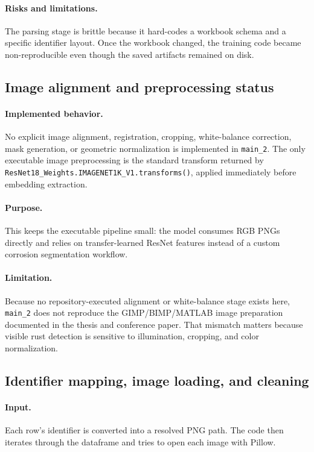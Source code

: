 \documentclass[11pt]{article}
\begin{document}
\paragraph{Risks and limitations.}
The parsing stage is brittle because it hard-codes a workbook schema and a specific identifier layout. Once the workbook changed, the training code became non-reproducible even though the saved artifacts remained on disk.

\subsection{Image alignment and preprocessing status}
\paragraph{Implemented behavior.}
No explicit image alignment, registration, cropping, white-balance correction, mask generation, or geometric normalization is implemented in \texttt{main\_2}. The only executable image preprocessing is the standard transform returned by \texttt{ResNet18\_Weights.IMAGENET1K\_V1.transforms()}, applied immediately before embedding extraction.

\paragraph{Purpose.}
This keeps the executable pipeline small: the model consumes RGB PNGs directly and relies on transfer-learned ResNet features instead of a custom corrosion segmentation workflow.

\paragraph{Limitation.}
Because no repository-executed alignment or white-balance stage exists here, \texttt{main\_2} does not reproduce the GIMP/BIMP/MATLAB image preparation documented in the thesis and conference paper. That mismatch matters because visible rust detection is sensitive to illumination, cropping, and color normalization.

\subsection{Identifier mapping, image loading, and cleaning}
\paragraph{Input.}
Each row's identifier is converted into a resolved PNG path. The code then iterates through the dataframe and tries to open each image with Pillow.
\end{document}
